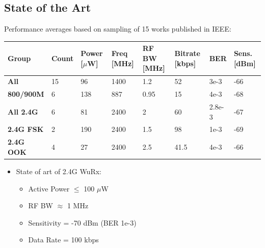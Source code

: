 \documentclass[10pt,a4paper]{article}
\begin{document}
		\subsection{State of the Art}
		\footnotesize
		Performance averages based on sampling of 15 works published in IEEE:
		\scriptsize
		\vspace{-1em}
		\begin{table}[htb!]
			\tiny
			\centering
			\def\arraystretch{1.5}		
			\setlength\arrayrulewidth{0.75pt}
			\setlength{\tabcolsep}{1em} %
			\begin{tabular}{|l|l|l|l|l|l|l|l|}
				\hline 
				\rule[-1ex]{0pt}{2.5ex} \cellcolor{gray!40}\textbf{Group} & \cellcolor{gray!40}\textbf{Count} & \cellcolor{gray!40}\textbf{Power [$\mu$W] }& \cellcolor{gray!40}\textbf{Freq [MHz]} & \cellcolor{gray!40}\textbf{RF BW [MHz]}& \cellcolor{gray!40}\textbf{Bitrate [kbps]}& \cellcolor{gray!40}\textbf{BER }& \cellcolor{gray!40}\textbf{Sens. [dBm]}\\ 
				\hline 
				\rule[-1ex]{0pt}{2.5ex} \textbf{All} & 15 & 96 & 1400 & 1.2 & 52 & 3e-3 & -66\\ 
				\hline 
				\rule[-1ex]{0pt}{2.5ex} \textbf{800/900M} & 6 & 138 & 887 & 0.95 & 15 & 4e-3 & -68\\ 
				\hline 
				\rule[-1ex]{0pt}{2.5ex} \textbf{All 2.4G} & 6 & 81 & 2400 & 2 & 60 & 2.8e-3 & -67\\ 
				\hline 
				\rule[-1ex]{0pt}{2.5ex} \textbf{2.4G FSK} & 2 & 190 & 2400 & 1.5 & 98 & 1e-3 & -69\\ 
				\hline 
				\rule[-1ex]{0pt}{2.5ex} \textbf{2.4G OOK} & 4 & 27 & 2400 & 2.5 & 41.5 & 4e-3 & -66\\ 
				\hline 
			\end{tabular} 
		\end{table}   
		\begin{itemize}
			\footnotesize
			\item State of art of 2.4G WuRx:
			\begin{itemize}
				\item Active Power $\leq$ 100 $\mu$W
				\item RF BW $\approx$ 1 MHz
				\item Sensitivity = -70 dBm (BER 1e-3)
				\item Data Rate = 100 kbps
			\end{itemize}
		\end{itemize}
\end{document}
